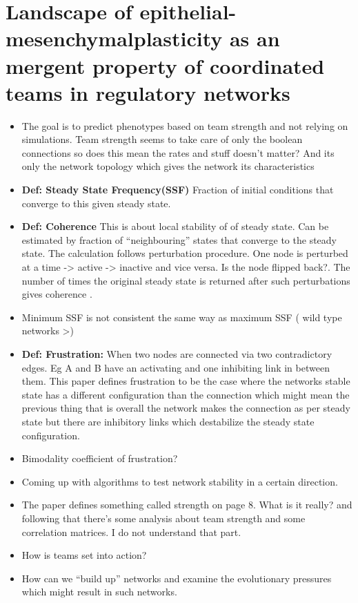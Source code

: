 \documentclass{article}
\begin{document}
\section{Landscape of epithelial-mesenchymalplasticity as an mergent property of coordinated teams in regulatory networks}
\begin{itemize}	
\item The goal is to predict phenotypes based on team strength and not relying on simulations. Team strength seems to take care of only the boolean connections so does this mean the rates and stuff doesn't matter? And its only the network topology which gives the network its characteristics 

\item \textbf{ Def: Steady State Frequency(SSF) } Fraction of initial conditions that converge to this given steady state.

\item \textbf{ Def: Coherence } This is about local stability of of steady state. Can be estimated by fraction of ``neighbouring'' states that converge to the steady state. The calculation follows perturbation procedure. One node is perturbed at a time -> active -> inactive and vice versa. Is the node flipped back?. The number of times the original steady state is returned after such perturbations gives coherence .

\item Minimum SSF is not consistent the same way as maximum SSF ( wild type networks >) 

\item \textbf{ Def: Frustration: } When two nodes are connected via two contradictory edges. Eg A and B have an activating and one inhibiting link in between them. This paper defines frustration to be the case where the networks stable state has a different configuration than the connection which might mean the previous thing that is overall the network makes the connection as per steady state but there are inhibitory links which destabilize the steady state configuration. 

\item Bimodality coefficient of frustration? 
\item Coming up with algorithms to test network stability in a certain direction. 

\item The paper defines something called strength on page 8. What is it really? and following that there's some analysis about team strength and some correlation matrices. I do not understand that part. 

\item How is teams set into action?

\item How can we ``build up'' networks and examine the evolutionary pressures which might result in such networks. 
\end{itemize}
\end{document}
